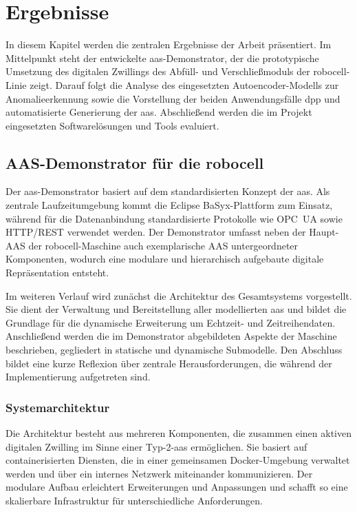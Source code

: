\newpage
\section{Ergebnisse}
\label{sec:Ergebnisse}
In diesem Kapitel werden die zentralen Ergebnisse der Arbeit präsentiert.
Im Mittelpunkt steht der entwickelte \acs{aas}-Demonstrator, der die prototypische Umsetzung des digitalen Zwillings des Abfüll- und Verschließmoduls der robocell-Linie zeigt.
Darauf folgt die Analyse des eingesetzten Autoencoder-Modells zur Anomalieerkennung sowie die Vorstellung der beiden Anwendungsfälle \acs{dpp} und automatisierte Generierung der \acs{aas}.
Abschließend werden die im Projekt eingesetzten Softwarelösungen und Tools evaluiert.

\subsection{AAS-Demonstrator für die robocell}
\label{sec:AAS-Demonstrator}
Der \acs{aas}-Demonstrator basiert auf dem standardisierten Konzept der \acs{aas}.
Als zentrale Laufzeitumgebung kommt die Eclipse BaSyx-Plattform zum Einsatz, während für die Datenanbindung standardisierte Protokolle wie OPC~UA sowie HTTP/REST verwendet werden.
Der Demonstrator umfasst neben der Haupt-AAS der robocell-Maschine auch exemplarische AAS untergeordneter Komponenten, wodurch eine modulare und hierarchisch aufgebaute digitale Repräsentation entsteht.

Im weiteren Verlauf wird zunächst die Architektur des Gesamtsystems vorgestellt.
Sie dient der Verwaltung und Bereitstellung aller modellierten \acs{aas} und bildet die Grundlage für die dynamische Erweiterung um Echtzeit- und Zeitreihendaten.
Anschließend werden die im Demonstrator abgebildeten Aspekte der Maschine beschrieben, gegliedert in statische und dynamische Submodelle.
Den Abschluss bildet eine kurze Reflexion über zentrale Herausforderungen, die während der Implementierung aufgetreten sind.

\subsubsection{Systemarchitektur}

Die Architektur besteht aus mehreren Komponenten, die zusammen einen aktiven digitalen Zwilling im Sinne einer Typ-2-\acs{aas} ermöglichen.
Sie basiert auf containerisierten Diensten, die in einer gemeinsamen Docker-Umgebung verwaltet werden und über ein internes Netzwerk miteinander kommunizieren.
Der modulare Aufbau erleichtert Erweiterungen und Anpassungen und schafft so eine skalierbare Infrastruktur für unterschiedliche Anforderungen.

